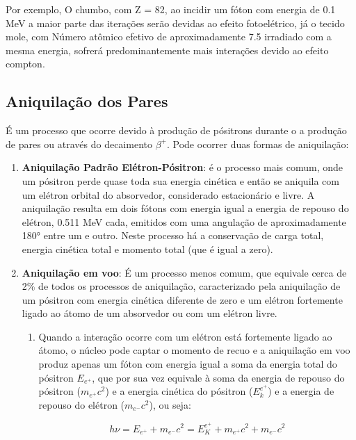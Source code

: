 \documentclass[11pt,a4paper]{article}
\newcounter{exemplo}
\begin{document}
    Por exemplo, O chumbo, com Z = 82, ao incidir um fóton com energia de 0.1 MeV a maior parte das iterações serão devidas ao efeito fotoelétrico, já o tecido mole, com Número atômico efetivo de aproximadamente 7.5 irradiado com a mesma energia, sofrerá predominantemente mais interações devido ao efeito compton.

\subsection*{Aniquilação dos Pares}

    É um processo que ocorre devido à produção de pósitrons durante o a produção de pares ou através do decaimento $\beta^+$. Pode ocorrer duas formas de aniquilação:
	
	\begin{enumerate}
		\item \textbf{\textcolor{CarnationPink}{Aniquilação Padrão Elétron-Pósitron}}: é o processo mais comum, onde um pósitron perde quase toda sua energia cinética e então se aniquila com um elétron orbital do absorvedor, considerado estacionário e livre. A aniquilação resulta em dois fótons com energia igual a energia de repouso do elétron,  0.511 MeV cada, emitidos com uma angulação de aproximadamente \ang{180} entre um e outro. Neste processo há a conservação de carga total, energia cinética total e momento total (que é igual a zero).
		
		\item \textbf{\textcolor{CarnationPink}{Aniquilação em voo}}: É um processo menos comum, que equivale  cerca de 2\% de todos os processos de aniquilação, caracterizado pela aniquilação de um pósitron com energia cinética diferente de zero e um elétron fortemente ligado ao átomo de um absorvedor ou com um elétron livre.

			\begin{enumerate}
				\item Quando a interação ocorre com um elétron está fortemente ligado ao átomo, o núcleo pode captar o momento de recuo e a aniquilação em voo produz apenas um fóton com energia igual a soma da energia total do pósitron $E_{e^+}$, que por sua vez equivale à soma da energia de repouso do pósitron ($m_{e^+}c^2$) e a energia cinética do pósitron ($E_k^{e^+}$) e a energia de repouso do elétron ($m_{e^-}c^2$), ou seja:
		
					\begin{equation}
						h\nu = E_{e^+} + m_{e^-}c^2
						= E_K^{e^+} + m_{e^+}c^2 + m_{e^-}c^2
					\end{equation}


\end{enumerate}
\end{enumerate}
\end{document}
